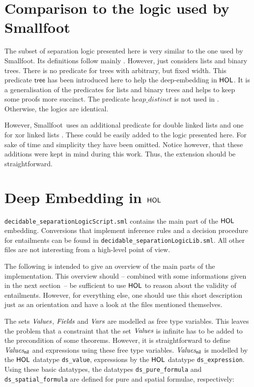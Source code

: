\documentclass{scrartcl}
\theoremstyle{definition}
\newcommand{\smallfoot}{{\sf Smallfoot}}
\newcommand{\HOL}{{\sf HOL}}
\newcommand{\nil}{{\textsf{nil}}}
\newcommand{\values}{{\emph{Values}}}
\newcommand{\valuesnil}{\ensuremath{\values_\nil}}
\newcommand{\vars}{{\emph{Vars}}}
\newcommand{\fields}{{\emph{Fields}}}
\newcommand{\sftree}{{\textsf{tree}}}
\newcommand{\heapdistinct}{\textit{heap\_distinct}}
\begin{document}
\section{Comparison to the logic used by \smallfoot}

The subset of separation logic presented here is very similar to the one used by
\smallfoot. Its definitions follow mainly \cite{berdine05symbolic}. However,
\cite{berdine05symbolic} just considers lists and binary trees. There is no
predicate for trees with arbitrary, but fixed width. This predicate $\sftree$
has been introduced here to help the deep-embedding in $\HOL$. It is a
generalisation of the predicates for lists and binary trees and helps to keep
some proofs more succinct. The predicate $\heapdistinct$ is not used
in \cite{berdine05symbolic}. Otherwise, the logics are identical.

However, \smallfoot\ uses an additional predicate 
for double linked lists and one for xor linked lists \cite{BerdineCO05}. These
could be easily added to the logic presented here. For sake of time and
simplicity they have been omitted. Notice however, that these additions were
kept in mind during this work. Thus, the extension should be
straightforward.



\section{Deep Embedding in $\HOL$}

\texttt{decidable\_separationLogicScript.sml} contains the main part of the
$\HOL$ embedding. Conversions that implement inference rules and a decision
procedure for entailments can be found in
\texttt{decidable\_separationLogicLib.sml}. All other files are not interesting from a high-level point
of view.

The following is intended to give an overview of the main parts of the
implementation. This overview should -- combined with some informations
given in the next section~-- be sufficient to use $\HOL$ to reason about the
validity of entailments. However, for everything else, one should use this
short description just as an orientation and have a look
at the files mentioned themselves.
\medskip

The sets $\values$, $\fields$ and $\vars$ are modelled as free type variables.
This leaves the problem that a constraint that the set $\values$ is infinite
has to be added to the precondition of some theorems. However, it is
straightforward to define $\valuesnil$ and expressions using these free type
variables. $\valuesnil$ is modelled by the $\HOL$ datatype 
\texttt{ds\_value}, expressions by the $\HOL$ datatype
\texttt{ds\_expression}. Using these basic datatypes, the datatypes \texttt{ds\_pure\_formula} and
\texttt{ds\_spatial\_formula} are defined for pure and spatial formulae,
respectively:
\end{document}
